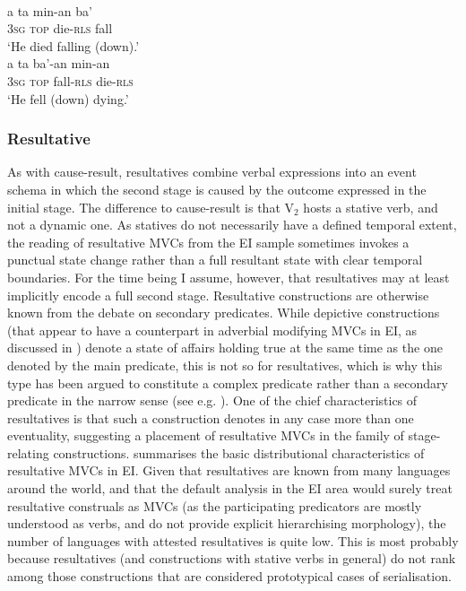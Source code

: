 \ea
{}\\
\ea \label{Teiwa_1}
\gll a ta min-an ba' \\
3\textsc{sg} \textsc{top} die-\textsc{rls} fall \\
\glft `He died falling (down).' \\ 
\ex \label{Teiwa_2}
\gll a ta ba'-an min-an \\ 
3\textsc{sg} \textsc{top} fall-\textsc{rls} die-\textsc{rls} \\
\glft `He fell (down) dying.'\\ 
\z
\z

\subsubsection{Resultative} \label{sec:resultative}

As with cause-result, resultatives combine verbal expressions into an event sche\-ma in which the second stage is caused by the outcome expressed in the initial stage. The difference to cause-result is that V$_2$ hosts a stative verb, and not a dynamic one. As statives do not necessarily have a defined temporal extent, the reading of resultative MVCs from the EI sample sometimes invokes a punctual state change rather than a full resultant state with clear temporal boundaries. For the time being I assume, however, that resultatives may at least implicitly encode a full second stage. Resultative constructions are otherwise known from
the debate on secondary predicates. While depictive constructions (that appear to have a counterpart in adverbial modifying MVCs in EI, as discussed in ) denote a state of affairs holding true at the same time as the one denoted by the main predicate, this is not so for resultatives, which is why this type has been argued to constitute a complex predicate rather than a secondary predicate in the narrow sense (see e.g. \citealt[66]{schultze2004depictive}). One of the chief characteristics of resultatives is that such a construction denotes in any case more than one eventuality, suggesting a placement of resultative MVCs in the family of stage-relating constructions.  summarises the basic distributional characteristics of resultative MVCs in EI. Given that resultatives are known from many languages around the world, and that the default analysis in the EI area would surely treat resultative construals as MVCs (as the participating predicators are mostly understood as verbs, and do not provide explicit hierarchising morphology), the number of languages with attested resultatives is quite low. This is most probably because resultatives (and constructions with stative verbs in general) do not rank among those constructions that are considered prototypical cases of serialisation.

